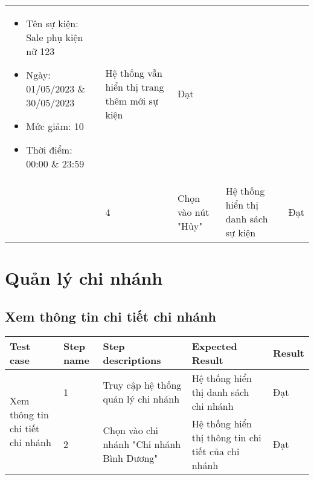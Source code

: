 {\begin{longtable}{| p{2.5cm}| p{1cm}| p{5.5cm}| p{4.5cm} | p{1.5cm} |}
\begin{itemize}
            \item Tên sự kiện: Sale phụ kiện nữ 123
            \item Ngày: 01/05/2023 \& 30/05/2023
            \item Mức giảm: 10
            \item Thời điểm: 00:00 \& 23:59 
        \end{itemize} & Hệ thống vẫn hiển thị trang thêm mới sự kiện & Đạt \\
        \cline{2-5}
         & 4 & Chọn vào nút "Hủy" & Hệ thống hiển thị danh sách sự kiện & Đạt \\
        \hline
    \end{longtable} 
}


\section{Quản lý chi nhánh}
\subsection{ Xem thông tin chi tiết chi nhánh}
{
    \setlength\extrarowheight{6pt}
    \begin{longtable}{| p{2.5cm}| p{1cm}| p{5.5cm}| p{4.5cm} | p{1.5cm} |}
        \hline
        \textbf{Test case} & \textbf{Step name} & \textbf{Step descriptions} & \textbf{Expected Result} & \textbf{Result} \\
        \hline
        \multirow[t]{2}{2.5cm}{ Xem thông tin chi tiết chi nhánh} & 1 & Truy cập hệ thống quản lý chi nhánh & Hệ thống hiển thị danh sách chi nhánh & Đạt \\
        \cline{2-5}
         & 2 & Chọn vào chi nhánh "Chi nhánh Bình Dương" & Hệ thống hiển thị thông tin chi tiết của chi nhánh & Đạt \\
         \hline
    \end{longtable}
}


